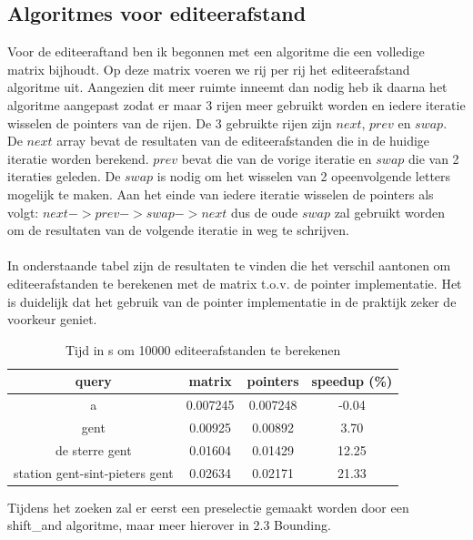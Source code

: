 \documentclass[11pt]{article}
\begin{document}
\subsection{Algoritmes voor editeerafstand}

Voor de editeeraftand ben ik begonnen met een algoritme die een volledige matrix bijhoudt. Op deze matrix voeren we rij per rij het editeerafstand algoritme uit. Aangezien dit meer ruimte inneemt dan nodig heb ik daarna het algoritme aangepast zodat er maar 3 rijen meer gebruikt worden en iedere iteratie wisselen de pointers van de rijen. De 3 gebruikte rijen zijn $next$, $prev$ en $swap$. De $next$ array bevat de resultaten van de editeerafstanden die in de huidige iteratie worden berekend. $prev$ bevat die van de vorige iteratie en $swap$ die van 2 iteraties geleden. De $swap$ is nodig om het wisselen van 2 opeenvolgende letters mogelijk te maken. Aan het einde van iedere iteratie wisselen de pointers als volgt: $ next -> prev -> swap -> next $ dus de oude $swap$ zal gebruikt worden om de resultaten van de volgende iteratie in weg te schrijven. \\
\\
\newpage
In onderstaande tabel zijn de resultaten te vinden die het verschil aantonen om editeerafstanden te berekenen met de matrix t.o.v. de pointer implementatie. Het is duidelijk dat het gebruik van de pointer implementatie in de praktijk zeker de voorkeur geniet.
\\
\begin{table}[H]
        \centering
        \begin{tabular}{ |c|c|c|c| }
                \hline
                query & matrix & pointers & speedup (\%)\\
                \hline
                a                              & 0.007245 & 0.007248 & -0.04\\
                gent                           & 0.00925 & 0.00892 & 3.70\\
                de sterre gent                 & 0.01604 & 0.01429 & 12.25\\
                station gent-sint-pieters gent & 0.02634 & 0.02171 & 21.33\\
                \hline
        \end{tabular}
        \caption{Tijd in s om 10000 editeerafstanden te berekenen}
\end{table}

Tijdens het zoeken zal er eerst een preselectie gemaakt worden door een shift\_and algoritme, maar meer hierover in 2.3 Bounding.\\
\\
\end{document}
